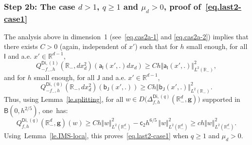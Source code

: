 \documentclass[JEP,XML,SOM,Unicode,NoEqCountersInSection,NoFloatCountersInSection,published]{cedram}
\newcommand{\mbf}[1]{\mathbf{#1}}
\theoremstyle{plain}
\theoremstyle{definition}
\begin{document}
\subsubsection*{Step 2b: The case $d>1$, $q \ge 1$ and $\mu_{d}>0$, proof of~\eqref{eq.last2-case1}}
The analysis above in dimension~1 (see~\eqref{eq.cas2a-1} and
\eqref{eq.cas2a-2}) implies that there exists $C>0$ (again,
independent of $x'$) such that for $h$ small enough, for all $\mathsf I$ and a.e. $x'\in \mathbb R^{d-1}$,
\[
Q^{\mathsf{Di},(1)}_{-f_-,h}(\mathbb R_-,dx_d^2) (\mathsf a_{\mathsf I}(x',.)dx_d) \ge Ch \Vert \mathsf a_{\mathsf I}(x',.) \Vert_{L^2(\mathbb R_-)}^2,
\]
and for $h$ small enough, for all $\mathsf J$ and a.e. $x'\in \mathbb R^{d-1}$,
\[
Q^{\mathsf{Di},(0)}_{-f_-,h}(\mathbb R_-,dx_d^2) (\mathsf b_{\mathsf J}(x',.)) \ge Ch \Vert \mathsf b_{\mathsf J}(x',.) \Vert_{L^2(\mathbb R_-)}^2.
\]
Thus, using Lemma~\ref{le.splitting}, for all $w\in D\bigl(\Delta_{f,h}^{\mathsf{Di},(q)}(\mathbb R_-^d, \mbf g) \bigr)$ supported in $\mathsf B(0,h^{2/5 })$, one~has:
\[
Q^{\mathsf{Di},(q)}_{f,h}(\mathbb R_-^d, \mbf g)(w)\ge Ch \Vert w \Vert_{L^2(\mathbb R^d_-)}^2-\mathsf c_2h^{6/5}\, \Vert w \Vert_{L^2(\mathbb R^d_-)}^2\ge ch \Vert w \Vert_{L^2(\mathbb R^d_-)}^2.
\]
Using~Lemma~\ref{le.IMS-loca}, this proves~\eqref{eq.last2-case1} when $q\ge 1$ and $\mu_{d}>0$.
\end{document}
